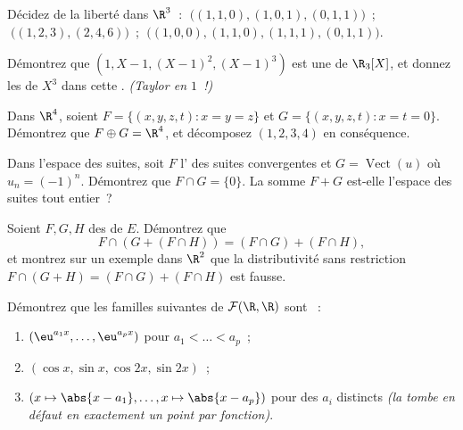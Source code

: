 \begin{exercise}[$\star$]\label{exo:b1:vspaces:3}
Décidez de la liberté dans $\R^3$~: $\;\bigl((1,1,0), (1,0,1),
(0,1,1)\bigr)$~; $\;\bigl((1,2,3), (2,4,6)\bigr)$~;
$\;\bigl((1,0,0), (1,1,0), (1,1,1), (0,1,1)\bigr)$.
\end{exercise}

\begin{exercise}[$\star$]\label{exo:b1:vspaces:4}
Démontrez que $(1, X - 1, (X-1)^2, (X-1)^3)$ est une  de
$\R_3[X]$, et donnez les  de $X^3$ dans cette .
\emph{(Taylor en $1$~!)}
\end{exercise}

\begin{exercise}[$\star\star$]\label{exo:b1:vspaces:5}
Dans $\R^4$, soient $F = \{(x,y,z,t) : x = y = z\}$ et $G = \{(x,y,z,t)
: x = t = 0\}$. Démontrez que $F \oplus G = \R^4$, et décomposez
$(1,2,3,4)$ en conséquence.
\end{exercise}

\begin{exercise}[$\star\star$]\label{exo:b1:vspaces:6}
Dans l'espace des suites, soit $F$ l' des suites convergentes
et $G = \operatorname{Vect}(u)$ où $u_n = (-1)^n$.
Démontrez que $F \cap G = \{0\}$. La somme $F + G$ est-elle l'espace
des suites tout entier~?
\end{exercise}

\begin{exercise}[$\star\star$]\label{exo:b1:vspaces:7}
Soient $F, G, H$ des  de $E$. Démontrez que
\[
F \cap (G + (F \cap H)) = (F \cap G) + (F \cap H),
\]
et montrez sur un exemple dans $\R^2$ que la distributivité sans
restriction $F \cap (G + H) = (F\cap G) + (F \cap H)$ est fausse.
\end{exercise}

\begin{exercise}[$\star\star\star$]\label{exo:b1:vspaces:8}
Démontrez que les familles suivantes de $\mathcal{F}(\R, \R)$ sont
~:
\begin{enumerate}
  \item $(\eu^{a_1 x}, \dots, \eu^{a_p x})$ pour $a_1 < \dots < a_p$~;
  \item $(\cos x, \sin x, \cos 2x, \sin 2x)$~;
  \item $(x \mapsto \abs{x - a_1}, \dots, x \mapsto \abs{x - a_p})$
        pour des $a_i$ distincts \emph{(la  tombe en
        défaut en exactement un point par fonction)}.
\end{enumerate}
\end{exercise}

